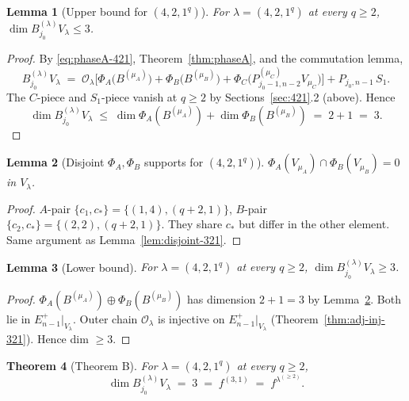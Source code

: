 \documentclass[11pt]{article}
\newtheorem{theorem}{Theorem}
\newtheorem{lemma}[theorem]{Lemma}
\theoremstyle{definition}
\begin{document}
\begin{lemma}[Upper bound for $(4, 2, 1^q)$]\label{lem:UB-421}
For $\lambda = (4, 2, 1^q)$ at every $q \ge 2$,
$\dim B^{(\lambda)}_{j_0} V_\lambda \le 3$.
\end{lemma}

\begin{proof}
By \eqref{eq:phaseA-421}, Theorem~\ref{thm:phaseA}, and the
commutation lemma,
\[
   B^{(\lambda)}_{j_0} V_\lambda
   \;=\;
   \mathcal{O}_\lambda
   \Big[
   \Phi_A\!\big(B^{(\mu_A)}\big)
   + \Phi_B\!\big(B^{(\mu_B)}\big)
   + \Phi_C\!\big(P^{(\mu_C)}_{j_0-1, n-2} V_{\mu_C}\big)
   \Big]
   + P_{j_0, n-1}\, S_1.
\]
The $C$-piece and $S_1$-piece vanish at $q \ge 2$ by
Sections~\ref{sec:421}.2 (above). Hence
\[
   \dim B^{(\lambda)}_{j_0} V_\lambda
   \;\le\; \dim \Phi_A(B^{(\mu_A)}) + \dim \Phi_B(B^{(\mu_B)})
   \;=\; 2 + 1 \;=\; 3.
\]
\end{proof}

\begin{lemma}[Disjoint $\Phi_A, \Phi_B$ supports for $(4, 2, 1^q)$]\label{lem:disjoint-421}
$\Phi_A(V_{\mu_A}) \cap \Phi_B(V_{\mu_B}) = 0$ in $V_\lambda$.
\end{lemma}

\begin{proof}
$A$-pair $\{c_1, c_*\} = \{(1, 4), (q+2, 1)\}$,
$B$-pair $\{c_2, c_*\} = \{(2, 2), (q+2, 1)\}$. They share $c_*$ but
differ in the other element. Same argument as
Lemma~\ref{lem:disjoint-321}.
\end{proof}

\begin{lemma}[Lower bound]\label{lem:LB-421}
For $\lambda = (4, 2, 1^q)$ at every $q \ge 2$,
$\dim B^{(\lambda)}_{j_0} V_\lambda \ge 3$.
\end{lemma}

\begin{proof}
$\Phi_A(B^{(\mu_A)}) \oplus \Phi_B(B^{(\mu_B)})$ has dimension $2 + 1
= 3$ by Lemma~\ref{lem:disjoint-421}. Both lie in $E_{n-1}^+|_{V_\lambda}$.
Outer chain $\mathcal{O}_\lambda$ is injective on $E_{n-1}^+|_{V_\lambda}$
(Theorem~\ref{thm:adj-inj-321}). Hence dim $\ge 3$.
\end{proof}

\begin{theorem}[Theorem B]\label{thm:421}
For $\lambda = (4, 2, 1^q)$ at every $q \ge 2$,
\[
   \dim B^{(\lambda)}_{j_0} V_\lambda \;=\; 3 \;=\; f^{(3, 1)}
   \;=\; f^{\lambda^{(\ge 2)}}.
\]
\end{theorem}
\end{document}
